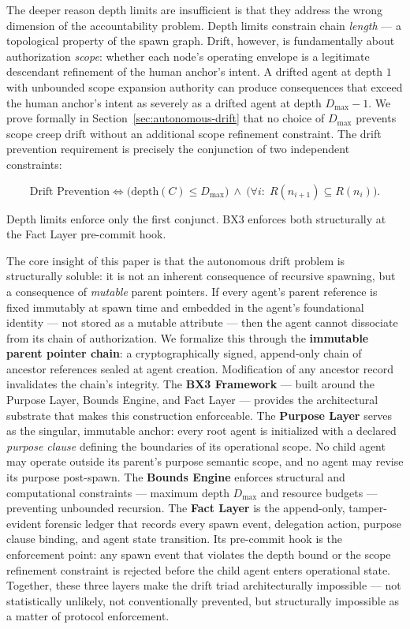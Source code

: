 The deeper reason depth limits are insufficient is that they address the wrong dimension of the accountability problem. Depth limits constrain chain \emph{length} — a topological property of the spawn graph. Drift, however, is fundamentally about authorization \emph{scope}: whether each node's operating envelope is a legitimate descendant refinement of the human anchor's intent. A drifted agent at depth $1$ with unbounded scope expansion authority can produce consequences that exceed the human anchor's intent as severely as a drifted agent at depth $D_{\max}-1$. We prove formally in Section~\ref{sec:autonomous-drift} that no choice of $D_{\max}$ prevents scope creep drift without an additional scope refinement constraint. The drift prevention requirement is precisely the conjunction of two independent constraints:

\begin{equation}
\text{Drift Prevention} \iff \bigl( \text{depth}(C) \leq D_{\max} \bigr)\ \land\ \bigl( \forall i:\; R(n_{i+1}) \subseteq R(n_i) \bigr).
\label{eq:intro-drift-prevention}
\end{equation}

Depth limits enforce only the first conjunct. BX3 enforces both structurally at the Fact Layer pre-commit hook.

The core insight of this paper is that the autonomous drift problem is structurally soluble: it is not an inherent consequence of recursive spawning, but a consequence of \emph{mutable} parent pointers. If every agent's parent reference is fixed immutably at spawn time and embedded in the agent's foundational identity — not stored as a mutable attribute — then the agent cannot dissociate from its chain of authorization. We formalize this through the \textbf{immutable parent pointer chain}: a cryptographically signed, append-only chain of ancestor references sealed at agent creation. Modification of any ancestor record invalidates the chain's integrity. The \textbf{BX3 Framework} — built around the Purpose Layer, Bounds Engine, and Fact Layer — provides the architectural substrate that makes this construction enforceable. The \textbf{Purpose Layer} serves as the singular, immutable anchor: every root agent is initialized with a declared \textit{purpose clause} defining the boundaries of its operational scope. No child agent may operate outside its parent's purpose semantic scope, and no agent may revise its purpose post-spawn. The \textbf{Bounds Engine} enforces structural and computational constraints — maximum depth $D_{\max}$ and resource budgets — preventing unbounded recursion. The \textbf{Fact Layer} is the append-only, tamper-evident forensic ledger that records every spawn event, delegation action, purpose clause binding, and agent state transition. Its pre-commit hook is the enforcement point: any spawn event that violates the depth bound or the scope refinement constraint is rejected before the child agent enters operational state. Together, these three layers make the drift triad architecturally impossible — not statistically unlikely, not conventionally prevented, but structurally impossible as a matter of protocol enforcement.

